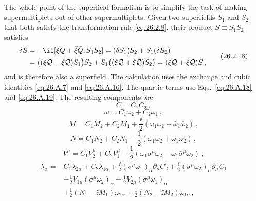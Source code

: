 The whole point of the superfield formalism is to simplify the task of making
supermultiplets out of other supermultiplets. Given two superfields $S_1$ and
$S_2$ that both satisfy the transformation rule \eqref{eq:26.2.8}, their
product $S\equiv S_1S_2$ satisfies
\begin{equation}
  \begin{aligned}
  \delta S&=-\ii[\xi Q+\bar\xi\bar Q,S_1S_2]
  =(\delta S_1)S_2+S_1(\delta S_2)\\
  &=\bigl((\xi\SuperQ+\bar\xi\bar{\SuperQ})S_1\bigr)S_2
    +S_1\bigl((\xi\SuperQ+\bar\xi\bar{\SuperQ})S_2\bigr)
  =(\xi\SuperQ+\bar\xi\bar{\SuperQ})S\,,
  \end{aligned}
  \tag{26.2.18}\label{eq:26.2.18}
\end{equation}
and is therefore also a superfield. The calculation uses the exchange and
cubic identities \eqref{eq:26.A.7} and \eqref{eq:26.A.16}. The quartic
terms use Eqs.~\eqref{eq:26.A.18} and \eqref{eq:26.A.19}. The resulting
components are
\begin{equation}
  C=C_1C_2\,,
  \tag{26.2.19}\label{eq:26.2.19}
\end{equation}
\begin{equation}
  \omega=C_1\omega_2+C_2\omega_1\,,
  \tag{26.2.20}\label{eq:26.2.20}
\end{equation}
\begin{equation}
  M=C_1M_2+C_2M_1
  +\frac{\ii}{2}(\omega_1\omega_2-\bar\omega_1\bar\omega_2)\,,
  \tag{26.2.21}\label{eq:26.2.21}
\end{equation}
\begin{equation}
  N=C_1N_2+C_2N_1
  -\frac12(\omega_1\omega_2+\bar\omega_1\bar\omega_2)\,,
  \tag{26.2.22}\label{eq:26.2.22}
\end{equation}
\begin{equation}
  V^\mu=C_1V_2^\mu+C_2V_1^\mu
  -\frac12\left(
    \omega_1\sigma^\mu\bar\omega_2
    -\bar\omega_1\bar\sigma^\mu\omega_2\right)\,,
  \tag{26.2.23}\label{eq:26.2.23}
\end{equation}
\begin{equation}
  \begin{aligned}
  \lambda_\alpha={}&C_1\lambda_{2\alpha}+C_2\lambda_{1\alpha}
  +\frac{\ii}{2}(\sigma^\mu\bar\omega_1)_\alpha\partial_\mu C_2
  +\frac{\ii}{2}(\sigma^\mu\bar\omega_2)_\alpha\partial_\mu C_1\\
  &-\frac12V_{1\mu}(\sigma^\mu\bar\omega_2)_\alpha
  -\frac12V_{2\mu}(\sigma^\mu\bar\omega_1)_\alpha\\
  &+\frac12(N_1-\ii M_1)\omega_{2\alpha}
  +\frac12(N_2-\ii M_2)\omega_{1\alpha}\,,
  \end{aligned}
  \tag{26.2.24}\label{eq:26.2.24}
\end{equation}
